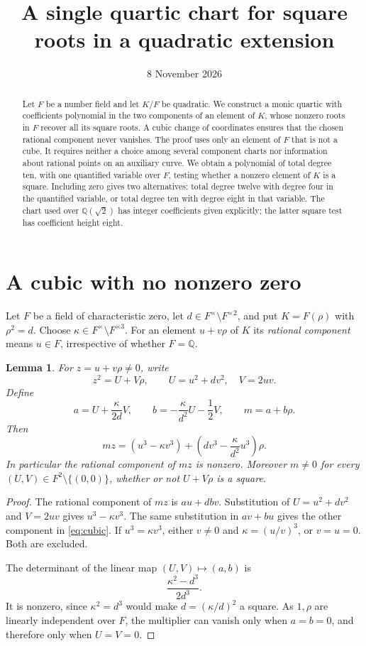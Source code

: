 \documentclass[11pt,a4paper]{article}
\title{A single quartic chart for square roots in a quadratic extension}
\author{}\date{8 November 2026}
\newtheorem{lemma}[theorem]{Lemma}
\newcommand{\Q}{\mathbb Q}
\begin{document}
\maketitle
\begin{abstract}
Let $F$ be a number field and let $K/F$ be quadratic. We construct
a monic quartic with coefficients polynomial in the two components
of an element of $K$, whose nonzero roots in $F$ recover all its
square roots. A cubic change of coordinates ensures that the
chosen rational component never vanishes. The proof uses only
an element of $F$ that is not a cube. It requires neither a choice
among several component charts nor information about rational
points on an auxiliary curve. We obtain a polynomial of total
degree ten, with one quantified variable over $F$, testing whether
a nonzero element of $K$ is a square. Including zero gives two
alternatives: total degree twelve with degree four in the quantified
variable, or total degree ten with degree eight in that variable.
The chart used over $\Q(\sqrt2)$ has integer coefficients given
explicitly; the latter square test has coefficient height eight.
\end{abstract}

\section{A cubic with no nonzero zero}

Let $F$ be a field of characteristic zero, let
$d\in F^\times\setminus F^{\times2}$, and put
$K=F(\rho)$ with $\rho^2=d$. Choose
$\kappa\in F^\times\setminus F^{\times3}$.
For an element $u+v\rho$ of $K$ its \emph{rational component}
means $u\in F$, irrespective of whether $F=\Q$.

\begin{lemma}\label{lem:cubic}
For $z=u+v\rho\ne0$, write
\[
 z^2=U+V\rho,\qquad U=u^2+dv^2,\quad V=2uv.
\]
Define
\begin{equation}\label{eq:multiplier}
 a=U+\frac{\kappa}{2d}V,\qquad
 b=-\frac{\kappa}{d^2}U-\frac12V,\qquad m=a+b\rho.
\end{equation}
Then
\begin{equation}\label{eq:cubic}
 mz=(u^3-\kappa v^3)
       +\left(dv^3-\frac{\kappa}{d^2}u^3\right)\rho.
\end{equation}
In particular the rational component of $mz$ is nonzero.
Moreover $m\ne0$ for every $(U,V)\in F^2\setminus\{(0,0)\}$,
whether or not $U+V\rho$ is a square.
\end{lemma}
\begin{proof}
The rational component of $mz$ is $au+dbv$. Substitution of
$U=u^2+dv^2$ and $V=2uv$ gives $u^3-\kappa v^3$.
The same substitution in $av+bu$ gives the other component
in \eqref{eq:cubic}. If $u^3=\kappa v^3$, either $v\ne0$
and $\kappa=(u/v)^3$, or $v=u=0$. Both are excluded.

The determinant of the linear map $(U,V)\mapsto(a,b)$ is
\[
 \frac{\kappa^2-d^3}{2d^3}.
\]
It is nonzero, since $\kappa^2=d^3$ would make
$d=(\kappa/d)^2$ a square. As $1,\rho$ are linearly independent
over $F$, the multiplier can vanish only when $a=b=0$, and
therefore only when $U=V=0$.
\end{proof}
\end{document}
